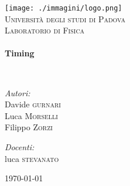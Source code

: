 \begin{titlepage}
\begin{center}

\texttt{[image: ./immagini/logo.png]}~\\[1cm]

\textsc{\LARGE Università degli studi di Padova}\\[1.5cm]

\textsc{\Large Laboratorio di Fisica}\\[0.5cm]

\HRule \\[0.4cm]
{ \huge \bfseries Timing \\ [0.4cm] }

\HRule \\[1.5cm]

\noindent
\begin{minipage}{0.4\textwidth}
\begin{flushleft} \large
\emph{Autori:}\\
Davide \textsc{gurnari}\\
Luca \textsc{Morselli}\\
Filippo \textsc{Zorzi}
\end{flushleft}
\end{minipage}%
\begin{minipage}{0.4\textwidth}
\begin{flushright} \large
\emph{Docenti:} \\
 luca \textsc{stevanato}
\end{flushright}
\end{minipage}

\vfill

{\large \today}

\end{center}
\end{titlepage}
